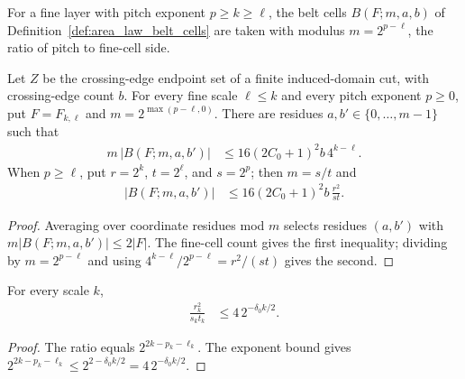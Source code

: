 For a fine layer with pitch exponent $p\ge k\ge\ell$, the belt cells
$B(F;m,a,b)$ of Definition~\ref{def:area_law_belt_cells} are taken with
modulus $m=2^{p-\ell}$, the ratio of pitch to fine-cell side.

\begin{lemma}
    \label{thm:area_law_fine_belt_shift}
    \leanok
    Let $Z$ be the crossing-edge endpoint set of a finite induced-domain
    cut, with crossing-edge count $b$. For every fine scale $\ell\le k$
    and every pitch exponent $p\ge0$, put $F=F_{k,\ell}$ and
    $m=2^{\max(p-\ell,0)}$.
    There are residues $a,b'\in\{0,\ldots,m-1\}$ such that
    \begin{align}
        m\,|B(F;m,a,b')| & \le16(2C_0+1)^2b\,4^{k-\ell}.
    \end{align}
    When $p\ge\ell$, put $r=2^k$, $t=2^\ell$, and $s=2^p$; then $m=s/t$
    and
    \begin{align}
        |B(F;m,a,b')| & \le16(2C_0+1)^2b\,\frac{r^2}{st}.
    \end{align}
\end{lemma}
\begin{proof}\leanok
    Averaging over coordinate residues mod $m$ selects residues $(a,b')$ with
    $m|B(F;m,a,b')|\le2|F|$. The fine-cell count gives the first inequality;
    dividing by $m=2^{p-\ell}$ and using $4^{k-\ell}/2^{p-\ell}=r^2/(st)$
    gives the second.
\end{proof}

\begin{lemma}
    \label{thm:area_law_fine_belt_ratio}
    \leanok
    For every scale $k$,
    \begin{align}
        \frac{r_k^2}{s_k t_k} & \le4\,2^{-\delta_0 k/2}.
    \end{align}
\end{lemma}
\begin{proof}\leanok
    The ratio equals $2^{2k-p_k-\ell_k}$. The exponent bound gives
    $2^{2k-p_k-\ell_k}\le2^{2-\delta_0 k/2}=4\,2^{-\delta_0 k/2}$.
\end{proof}


